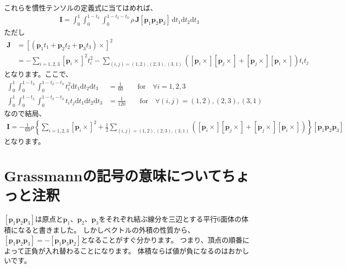 \documentclass{jsarticle}
\begin{document}
これらを慣性テンソルの定義式に当てはめれば、
\begin{align*}
\boldsymbol{I}
=\int_{0}^{1}\int_{0}^{1-t_{3}}\int_{0}^{1-t_{2}-t_{3}}\rho\,\boldsymbol{J}[\boldsymbol{p}_{1} \boldsymbol{p}_{2} \boldsymbol{p}_{3}]\,\mathrm{d}t_{1}\mathrm{d}t_{2}\mathrm{d}t_{3}
\end{align*}
ただし
\begin{align*}
\boldsymbol{J}
&=
\left[(\boldsymbol{p}_{1}t_{1}+\boldsymbol{p}_{2}t_{2}+\boldsymbol{p}_{3}t_{3})\times\right]^{2}
\\
&=
-\sum_{i=1,2,3}\left[\boldsymbol{p}_{i}\times\right]^{2}t_{i}^{2}
-\sum_{(i,j)=(1,2),(2,3),(3,1)}\left(\left[\boldsymbol{p}_{i}\times\right]\left[\boldsymbol{p}_{j}\times\right]+\left[\boldsymbol{p}_{j}\times\right]\left[\boldsymbol{p}_{i}\times\right]\right)t_{i}t_{j}
\end{align*}
となります。ここで、
\begin{align*}
\int_{0}^{1}\int_{0}^{1-t_{3}}\int_{0}^{1-t_{2}-t_{3}}t_{i}^{2}\mathrm{d}t_{1}\mathrm{d}t_{2}\mathrm{d}t_{3}
&=\frac{1}{60}\qquad\mbox{for}\quad \forall i=1,2,3
\\
\int_{0}^{1}\int_{0}^{1-t_{3}}\int_{0}^{1-t_{2}-t_{3}}t_{i}t_{j}\mathrm{d}t_{1}\mathrm{d}t_{2}\mathrm{d}t_{3}
&=\frac{1}{120}
\qquad\mbox{for}\quad \forall (i,j)=(1,2),(2,3),(3,1)
\end{align*}
なので結局、
\begin{align*}
\boldsymbol{I}
=-\frac{1}{60}\rho\left\{
\sum_{i=1,2,3}\left[\boldsymbol{p}_{i}\times\right]^{2}
+\frac{1}{2}
\sum_{(i,j)=(1,2),(2,3),(3,1)}\left(\left[\boldsymbol{p}_{i}\times\right]\left[\boldsymbol{p}_{j}\times\right]+\left[\boldsymbol{p}_{j}\times\right]\left[\boldsymbol{p}_{i}\times\right]\right)
\right\}[\boldsymbol{p}_{1} \boldsymbol{p}_{2} \boldsymbol{p}_{3}]
\end{align*}
となります。

\section{Grassmannの記号の意味についてちょっと注釈}

$[\boldsymbol{p}_{1} \boldsymbol{p}_{2} \boldsymbol{p}_{3}]$は原点と$\boldsymbol{p}_{1}$、$\boldsymbol{p}_{2}$、$\boldsymbol{p}_{3}$をそれぞれ結ぶ線分を三辺とする平行6面体の体積になると書きました。
しかしベクトルの外積の性質から、$[\boldsymbol{p}_{1} \boldsymbol{p}_{2} \boldsymbol{p}_{3}]=-[\boldsymbol{p}_{1} \boldsymbol{p}_{3} \boldsymbol{p}_{2}]$となることがすぐ分かります。
つまり、頂点の順番によって正負が入れ替わることになります。
体積ならば値が負になるのはおかしいです。
\end{document}
